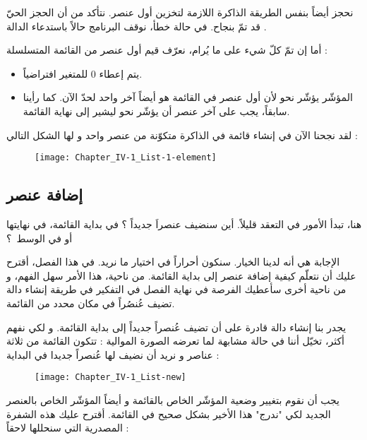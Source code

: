 نحجز أيضاً بنفس الطريقة الذاكرة اللازمة لتخزين أول عنصر. نتأكد من أن الحجز الحيّ قد تمّ بنجاح. في حالة خطأ، نوقف البرنامج حالاً باستدعاء الدالة
.

أما إن تمّ كلّ شيء على ما يُرام، نعرّف قيم أول عنصر من القائمة المتسلسلة :

\begin{itemize}
	\item يتم إعطاء $ 0 $ للمتغير
	افتراضياً.
	\item المؤشّر
	يؤشّر نحو
	لأن أول عنصر في القائمة هو أيضاً آخر واحد لحدّ الآن. كما رأينا سابقاً، يجب على آخر عنصر أن يؤشّر نحو
	ليشير إلى نهاية القائمة.
\end{itemize}

لقد نجحنا الآن في إنشاء قائمة في الذاكرة متكوّنة من عنصر واحد و لها الشكل التالي :

\begin{figure}[H]
	\centering
	\texttt{[image: Chapter\_IV-1\_List-1-element]}
\end{figure}

\subsection{إضافة عنصر}

هنا، تبدأ الأمور في التعقد قليلاً. أين سنضيف عنصراَ جديداً ؟ في بداية القائمة، في نهايتها أو في الوسط~؟

الإجابة هي أنه لدينا الخيار. سنكون أحراراً في اختيار ما نريد. في هذا الفصل، أقترح عليك أن نتعلّم كيفية إضافة عنصر إلى بداية القائمة. من ناحية، هذا الأمر سهل الفهم، و من ناحية أخرى سأعطيك الفرصة في نهاية الفصل في التفكير في طريقة إنشاء دالة تضيف عُنصُراً في مكان محدد من القائمة.

يجدر بنا إنشاء دالة قادرة على أن تضيف عُنصراً جديداً إلى بداية القائمة. و لكي نفهم أكثر، تخيّل أننا في حالة مشابهة لما تعرضه الصورة الموالية : تتكون القائمة من ثلاثة عناصر و نريد أن نضيف لها عُنصراً جديدا في البداية :

\begin{figure}[H]
	\centering
	\texttt{[image: Chapter\_IV-1\_List-new]}
\end{figure}

يجب أن نقوم بتغيير وضعية المؤشّر
الخاص بالقائمة و أيضاً المؤشّر
الخاص بالعنصر الجديد لكي "ندرج" هذا الأخير بشكل صحيح في القائمة. أقترح عليك هذه الشفرة المصدرية التي سنحللها لاحقاً :

